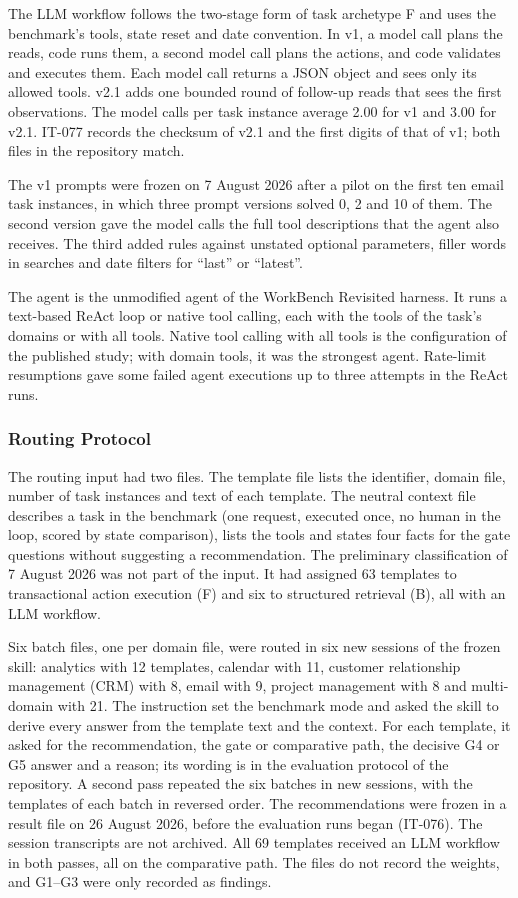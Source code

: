 The LLM workflow follows the two-stage form of task archetype F and uses the benchmark's tools, state reset and date convention. In v1, a model call plans the reads, code runs them, a second model call plans the actions, and code validates and executes them. Each model call returns a JSON object and sees only its allowed tools. v2.1 adds one bounded round of follow-up reads that sees the first observations. The model calls per task instance average 2.00 for v1 and 3.00 for v2.1. IT-077 records the checksum of v2.1 and the first digits of that of v1; both files in the repository match.

The v1 prompts were frozen on 7 August 2026 after a pilot on the first ten email task instances, in which three prompt versions solved 0, 2 and 10 of them. The second version gave the model calls the full tool descriptions that the agent also receives. The third added rules against unstated optional parameters, filler words in searches and date filters for ``last'' or ``latest''.

The agent is the unmodified agent of the WorkBench Revisited harness. It runs a text-based ReAct loop or native tool calling, each with the tools of the task's domains or with all tools. Native tool calling with all tools is the configuration of the published study; with domain tools, it was the strongest agent. Rate-limit resumptions gave some failed agent executions up to three attempts in the ReAct runs.

\subsubsection{Routing Protocol}
\label{app:eval2/routing}
The routing input had two files. The template file lists the identifier, domain file, number of task instances and text of each template. The neutral context file describes a task in the benchmark (one request, executed once, no human in the loop, scored by state comparison), lists the tools and states four facts for the gate questions without suggesting a recommendation. The preliminary classification of 7 August 2026 was not part of the input. It had assigned 63 templates to transactional action execution (F) and six to structured retrieval (B), all with an LLM workflow.

Six batch files, one per domain file, were routed in six new sessions of the frozen skill: analytics with 12 templates, calendar with 11, customer relationship management (CRM) with 8, email with 9, project management with 8 and multi-domain with 21. The instruction set the benchmark mode and asked the skill to derive every answer from the template text and the context. For each template, it asked for the recommendation, the gate or comparative path, the decisive G4 or G5 answer and a reason; its wording is in the evaluation protocol of the repository. A second pass repeated the six batches in new sessions, with the templates of each batch in reversed order. The recommendations were frozen in a result file on 26 August 2026, before the evaluation runs began (IT-076). The session transcripts are not archived. All 69 templates received an LLM workflow in both passes, all on the comparative path. The files do not record the weights, and G1--G3 were only recorded as findings.

